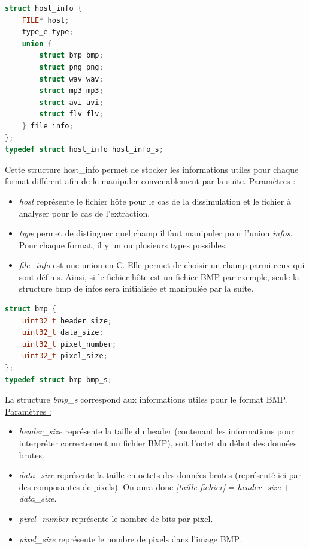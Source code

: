 \documentclass[11pt]{article}
\begin{document}
\begin{lstlisting}[language=c]
struct host_info {
    FILE* host;
    type_e type;
    union {
        struct bmp bmp;
        struct png png;
        struct wav wav;
        struct mp3 mp3;
        struct avi avi;
        struct flv flv;
    } file_info;
};
typedef struct host_info host_info_s;
\end{lstlisting}

Cette structure host\_info permet de stocker les informations 
utiles pour chaque format différent afin de le manipuler convenablement 
par la suite. 
\newline
\underline{Paramètres :}
\begin{itemize}
\item \textit{host} représente le fichier hôte pour le cas de la dissimulation 
et le fichier à analyser pour le cas de l'extraction. 
\item \textit{type} permet de distinguer quel champ il faut manipuler pour l'union 
\textit{infos}. Pour chaque format, il y un ou plusieurs types possibles.
\item \textit{file\_info} est une union en C. Elle permet de choisir un champ parmi
ceux qui sont définis. Ainsi, si le fichier hôte est un fichier BMP par exemple, 
seule la structure bmp de infos sera initialisée et manipulée par la suite.
\newline
\end{itemize}

\begin{lstlisting}[language=c]
struct bmp {
    uint32_t header_size;
    uint32_t data_size;
    uint32_t pixel_number;
    uint32_t pixel_size;
};
typedef struct bmp bmp_s;
\end{lstlisting}

La structure \textit{bmp\_s} correspond aux informations 
utiles pour le format BMP.  
\newline
\underline{Paramètres :}
\begin{itemize}
\item \textit{header\_size} représente la taille du header (contenant les 
informations pour interpréter correctement un fichier BMP), soit l'octet 
du début des données brutes. 
\item \textit{data\_size} représente la taille en octets des données brutes 
(représenté ici par des composantes de pixels). On aura donc 
\textit{[taille fichier]} = \textit{header\_size} + \textit{data\_size}.
\item \textit{pixel\_number} représente le nombre de bits par pixel. 
\item \textit{pixel\_size} représente le nombre de pixels dans l'image BMP. 
\newline
\end{itemize}
\end{document}
